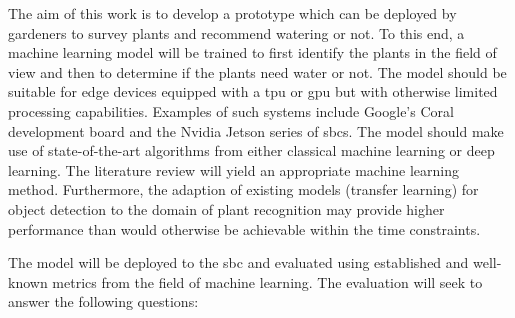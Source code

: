 \documentclass[final]{vutinfth} %
\begin{document}
The aim of this work is to develop a prototype which can be deployed
by gardeners to survey plants and recommend watering or not. To this
end, a machine learning model will be trained to first identify the
plants in the field of view and then to determine if the plants need
water or not. The model should be suitable for edge devices equipped
with a \gls{tpu} or \gls{gpu} but with otherwise limited processing
capabilities. Examples of such systems include Google's Coral
development board and the Nvidia Jetson series of \glspl{sbc}. The
model should make use of state-of-the-art algorithms from either
classical machine learning or deep learning. The literature review
will yield an appropriate machine learning method. Furthermore, the
adaption of existing models (transfer learning) for object detection
to the domain of plant recognition may provide higher performance than
would otherwise be achievable within the time constraints.

The model will be deployed to the \gls{sbc} and evaluated using
established and well-known metrics from the field of machine
learning. The evaluation will seek to answer the following questions:
\end{document}

